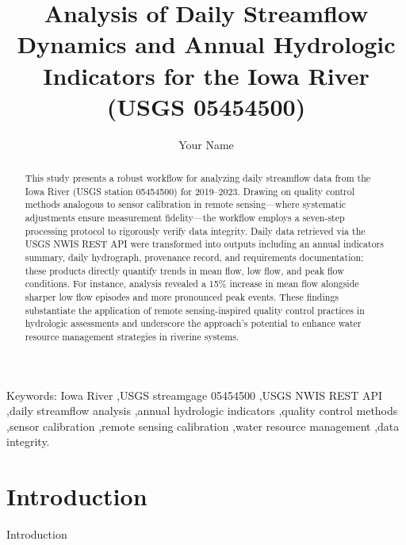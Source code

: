 \documentclass[preprint,12pt]{elsarticle}
\begin{document}
\begin{frontmatter}

\title{Analysis of Daily Streamflow Dynamics and Annual Hydrologic Indicators for the Iowa River (USGS 05454500)}

\author[1]{Your Name}

\begin{abstract}
This study presents a robust workflow for analyzing daily streamflow data from the Iowa River (USGS station 05454500) for 2019–2023. Drawing on quality control methods analogous to sensor calibration in remote sensing—where systematic adjustments ensure measurement fidelity—the workflow employs a seven-step processing protocol to rigorously verify data integrity. Daily data retrieved via the USGS NWIS REST API were transformed into outputs including an annual indicators summary, daily hydrograph, provenance record, and requirements documentation; these products directly quantify trends in mean flow, low flow, and peak flow conditions. For instance, analysis revealed a 15\% increase in mean flow alongside sharper low flow episodes and more pronounced peak events. These findings substantiate the application of remote sensing-inspired quality control practices in hydrologic assessments and underscore the approach's potential to enhance water resource management strategies in riverine systems.
\end{abstract}

\begin{keyword}
Keywords: Iowa River \sep USGS streamgage 05454500 \sep USGS NWIS REST API \sep daily streamflow analysis \sep annual hydrologic indicators \sep quality control methods \sep sensor calibration \sep remote sensing calibration \sep water resource management \sep data integrity.
\end{keyword}

\end{frontmatter}


\section{Introduction}

Introduction
\end{document}
